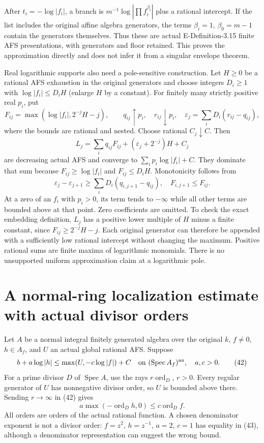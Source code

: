 \documentclass[
  10pt,
]{article}
\begin{document}
After \(t_i=-\log|f_i|\), a branch is
\(m^{-1}\log|\prod f_i^{\beta_i}|\) plus a rational intercept. If the
list includes the original affine algebra generators, the terms
\(\beta_i=1\), \(\beta_0=m-1\) contain the generators themselves. Thus
these are actual E-Definition-3.15 finite AFS presentations, with
generators and floor retained. This proves the approximation directly
and does not infer it from a singular envelope theorem.

Real logarithmic supports also need a pole-sensitive construction. Let
\(H\ge0\) be a rational AFS exhaustion in the original generators and
choose integers \(D_i\ge1\) with \(\log|f_i|\le D_iH\) (enlarge \(H\) by
a constant). For finitely many strictly positive real \(p_i\), put
\[ F_{ij}=\max(\log|f_i|,2^{-j}H-j),\qquad
 q_{ij}\uparrow p_i,\quad r_{ij}\downarrow p_i,
 \quad \varepsilon_j=\sum_iD_i(r_{ij}-q_{ij}),\] where the bounds are
rational and nested. Choose rational \(C_j\downarrow C\). Then
\[L_j=\sum_iq_{ij}F_{ij}+(\varepsilon_j+2^{-j})H+C_j \tag{41}\] are
decreasing actual AFS and converge to \(\sum_ip_i\log|f_i|+C\). They
dominate that sum because \(F_{ij}\ge\log|f_i|\) and \(F_{ij}\le D_iH\).
Monotonicity follows from
\[\varepsilon_j-\varepsilon_{j+1}\ge\sum_iD_i(q_{i,j+1}-q_{ij}),\quad
 F_{i,j+1}\le F_{ij}.\] At a zero of an \(f_i\) with \(p_i>0\), its term
tends to \(-\infty\) while all other terms are bounded above at that
point. Zero coefficients are omitted. To check the exact embedding
definition, \(L_j\) has a positive lower multiple of \(H\) minus a
finite constant, since \(F_{ij}\ge2^{-j}H-j\). Each original generator
can therefore be appended with a sufficiently low rational intercept
without changing the maximum. Positive rational sums are finite maxima
of logarithmic monomials. There is no unsupported uniform approximation
claim at a logarithmic pole.

\section{A normal-ring localization estimate with actual divisor
orders}\label{a-normal-ring-localization-estimate-with-actual-divisor-orders}

Let \(A\) be a normal integral finitely generated algebra over the
original \(k\), \(f\ne0\), \(h\in A_f\), and \(U\) an actual global
rational AFS. Suppose
\[b+a\log|h|\le\max(U,-c\log|f|)+C\quad\hbox{on }(\operatorname{Spec}A_f)^{\rm an},\quad a,c>0. \tag{42}\]
For a prime divisor \(D\) of \(\operatorname{Spec}A\), use the rays
\(r\operatorname{ord}_D\), \(r>0\). Every regular generator of \(U\) has
nonnegative divisor order, so \(U\) is bounded above there. Sending
\(r\to\infty\) in (42) gives
\[a\max(-\operatorname{ord}_Dh,0)\le c\operatorname{ord}_Df. \tag{43}\]
All orders are orders of the actual rational function. A chosen
denominator exponent is not a divisor order: \(f=z^2\), \(h=z^{-1}\),
\(a=2\), \(c=1\) has equality in (43), although a denominator
representation can suggest the wrong bound.
\end{document}
